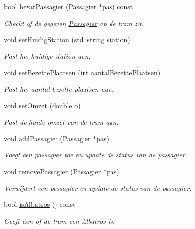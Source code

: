 \begin{DoxyCompactItemize}
bool \hyperlink{class_tram_a08a7580a396d9c50d5fe0ec170b41f7f}{bevat\+Passagier} (\hyperlink{class_passagier}{Passagier} $\ast$pas) const 
\begin{DoxyCompactList}\small\item\em Checkt of de gegeven \hyperlink{class_passagier}{Passagier} op de tram zit. \end{DoxyCompactList}\item 
void \hyperlink{class_tram_ad8627700455e2d24563e08a72d887197}{set\+Huidig\+Station} (std\+::string station)
\begin{DoxyCompactList}\small\item\em Past het huidige station aan. \end{DoxyCompactList}\item 
void \hyperlink{class_tram_a6582d8608c8091069ad9c017294b9a32}{set\+Bezette\+Plaatsen} (int aantal\+Bezette\+Plaatsen)
\begin{DoxyCompactList}\small\item\em Past het aantal bezette plaatsen aan. \end{DoxyCompactList}\item 
void \hyperlink{class_tram_ac6b56586355e176b797e0beefeb9c5dd}{set\+Omzet} (double o)
\begin{DoxyCompactList}\small\item\em Past de huide omzet van de tram aan. \end{DoxyCompactList}\item 
void \hyperlink{class_tram_a4d173613afa04c4135a558cb6eed5d81}{add\+Passagier} (\hyperlink{class_passagier}{Passagier} $\ast$pas)
\begin{DoxyCompactList}\small\item\em Voegt een passagier toe en update de status van de passagier. \end{DoxyCompactList}\item 
void \hyperlink{class_tram_a1bdb1543c1abbb722c6daa7b83021001}{remove\+Passagier} (\hyperlink{class_passagier}{Passagier} $\ast$pas)
\begin{DoxyCompactList}\small\item\em Verwijdert een passagier en update de status van de passagier. \end{DoxyCompactList}\item 
bool \hyperlink{class_tram_aa83f6243d4a2d0885bbe5ce262ba061f}{is\+Albatros} () const 
\begin{DoxyCompactList}\small\item\em Geeft aan of de tram een Albatros is. \end{DoxyCompactList}\item 

\end{DoxyCompactItemize}
